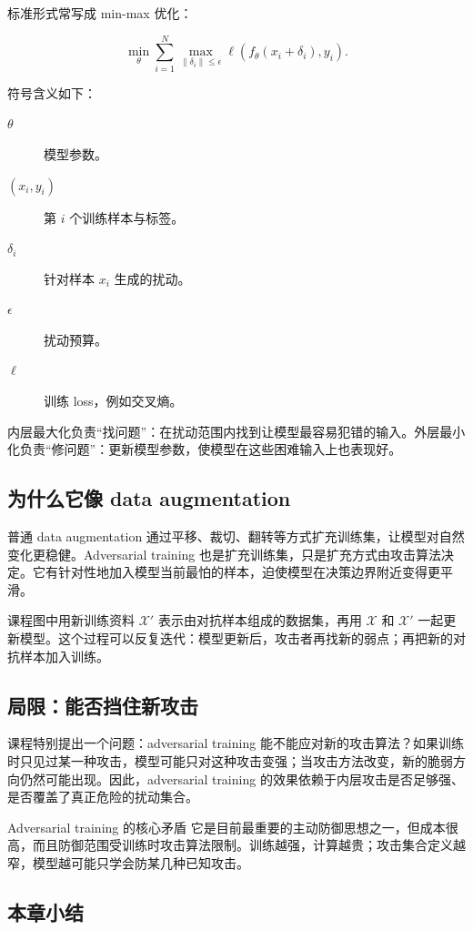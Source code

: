 \documentclass[a4paper]{article}
\begin{document}
标准形式常写成 min-max 优化：

\[
\min_\theta
\sum_{i=1}^{N}
\max_{\|\delta_i\|\le \epsilon}
\ell(f_\theta(x_i+\delta_i),y_i).
\]

符号含义如下：
\begin{description}
    \item[$\theta$] 模型参数。
    \item[$(x_i,y_i)$] 第 $i$ 个训练样本与标签。
    \item[$\delta_i$] 针对样本 $x_i$ 生成的扰动。
    \item[$\epsilon$] 扰动预算。
    \item[$\ell$] 训练 loss，例如交叉熵。
\end{description}

内层最大化负责“找问题”：在扰动范围内找到让模型最容易犯错的输入。外层最小化负责“修问题”：更新模型参数，使模型在这些困难输入上也表现好。

\subsection{为什么它像 data augmentation}

普通 data augmentation 通过平移、裁切、翻转等方式扩充训练集，让模型对自然变化更稳健。Adversarial training 也是扩充训练集，只是扩充方式由攻击算法决定。它有针对性地加入模型当前最怕的样本，迫使模型在决策边界附近变得更平滑。

课程图中用新训练资料 $\mathcal{X}'$ 表示由对抗样本组成的数据集，再用 $\mathcal{X}$ 和 $\mathcal{X}'$ 一起更新模型。这个过程可以反复迭代：模型更新后，攻击者再找新的弱点；再把新的对抗样本加入训练。

\subsection{局限：能否挡住新攻击}

课程特别提出一个问题：adversarial training 能不能应对新的攻击算法？如果训练时只见过某一种攻击，模型可能只对这种攻击变强；当攻击方法改变，新的脆弱方向仍然可能出现。因此，adversarial training 的效果依赖于内层攻击是否足够强、是否覆盖了真正危险的扰动集合。

\begin{knowledgebox}{Adversarial training 的核心矛盾}
    它是目前最重要的主动防御思想之一，但成本很高，而且防御范围受训练时攻击算法限制。训练越强，计算越贵；攻击集合定义越窄，模型越可能只学会防某几种已知攻击。
\end{knowledgebox}

\subsection{本章小结}
\end{document}
